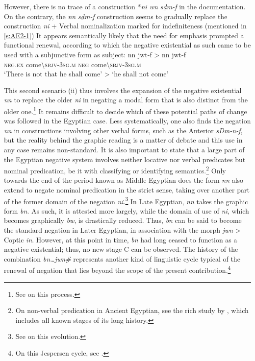 \documentclass[output=paper,draft,draftmode,colorlinks,citecolor=brown]{langscibook}
\begin{document}
However, there is no trace of a construction *\textit{ni wn sḏm-f} in the documentation. On the contrary, the \textit{nn sḏm-f} construction seems to gradually replace the construction \textit{ni} + Verbal nominalization marked for indefiniteness (mentioned in \ref{s:AE2-1}) It appears semantically likely that the need for emphasis prompted a functional renewal, according to which the negative existential as such came to be used with a subjunctive form as subject:
\ea \label{ex:AE36}
    \gll nn jwt-f > nn jwt-f \\
    \textsc{neg.ex} come\textbackslash\textsc{sbjv-3sg.m} { } \textsc{neg} come\textbackslash\textsc{sbjv-3sg.m} \\ 
    \glt ‘There is not that he shall come’ > ‘he shall not come’ 
\z
 
This second scenario (ii) thus involves the expansion of the negative existential \textit{nn} to replace the older \textit{ni} in negating a modal form that is also distinct from the older one.\footnote{See \citet{Vernus1990} on this process. } It remains difficult to decide which of these potential paths of change was followed in the Egyptian case.  
Less systematically, one also finds the negation \textit{nn} in constructions involving other verbal forms, such as the Anterior \textit{sDm-n-f}, but the reality behind the graphic reading is a matter of debate and this use in any case remains non-standard. It is also important to state that a large part of the Egyptian negative system involves neither locative nor verbal predicates but nominal predication, be it with classifying or identifying semantics.\footnote{On non-verbal predication in Ancient Egyptian, see the rich study by \citet{Loprieno-etal2017}, which includes all known stages of its long history. } 
Only towards the end of the period known as Middle Egyptian does the form \textit{nn} also extend to negate nominal predication in the strict sense, taking over another part of the former domain of the negation \textit{ni}.\footnote{See \citet{Uljas2013} on this evolution.} 
In Late Egyptian, \textit{nn} takes the graphic form \textit{bn}. As such, it is attested more largely, while the domain of use of \textit{ni}, which becomes graphically \textit{bw}, is drastically reduced. Thus, \textit{bn} can be said to become the standard negation in Later Egyptian, in association with the morph \textit{jwn\ꜣ} > Coptic \textit{in}.
However, at this point in time, \textit{bn} had long ceased to function as a negative existential; thus, no new stage C can be observed. The history of the combination \textit{bn…jwn\#} represents another kind of linguistic cycle typical of the renewal of negation that lies beyond the scope of the present contribution.\footnote{On this Jespersen cycle, see \citet{Winand1997}.}   
\end{document}
